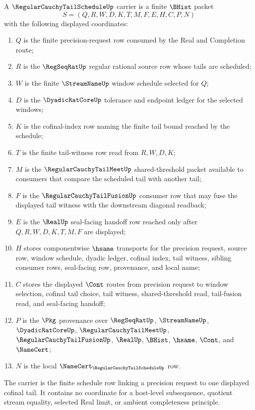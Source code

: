 \begin{definition}
\label{def:regular-cauchy-tail-schedule-carrier}
A $\RegularCauchyTailScheduleUp$ carrier is a finite $\BHist$ packet
$$
S=(Q,R,W,D,K,T,M,F,E,H,C,P,N)
$$
with the following displayed coordinates:
\begin{enumerate}
\item $Q$ is the finite precision-request row consumed by the Real and Completion route;
\item $R$ is the $\RegSeqRatUp$ regular rational source row whose tails are scheduled;
\item $W$ is the finite $\StreamNameUp$ window schedule selected for $Q$;
\item $D$ is the $\DyadicRatCoreUp$ tolerance and endpoint ledger for the selected windows;
\item $K$ is the cofinal-index row naming the finite tail bound reached by the schedule;
\item $T$ is the finite tail-witness row read from $R,W,D,K$;
\item $M$ is the $\RegularCauchyTailMeetUp$ shared-threshold packet available to consumers that compare the scheduled tail with another tail;
\item $F$ is the $\RegularCauchyTailFusionUp$ consumer row that may fuse the displayed tail witness with the downstream diagonal readback;
\item $E$ is the $\RealUp$ seal-facing handoff row reached only after $Q,R,W,D,K,T,M,F$ are displayed;
\item $H$ stores componentwise $\hsame$ transports for the precision request, source row, window schedule, dyadic ledger, cofinal index, tail witness, sibling consumer rows, seal-facing row, provenance, and local name;
\item $C$ stores the displayed $\Cont$ routes from precision request to window selection, cofinal tail choice, tail witness, shared-threshold read, tail-fusion read, and seal-facing handoff;
\item $P$ is the $\Pkg$ provenance over $\RegSeqRatUp$, $\StreamNameUp$, $\DyadicRatCoreUp$, $\RegularCauchyTailMeetUp$, $\RegularCauchyTailFusionUp$, $\RealUp$, $\BHist$, $\hsame$, $\Cont$, and $\NameCert$;
\item $N$ is the local $\NameCert_{\RegularCauchyTailScheduleUp}$ row.
\end{enumerate}
The carrier is the finite schedule row linking a precision request to one displayed cofinal tail. It contains no coordinate for a host-level subsequence, quotient stream equality, selected Real limit, or ambient completeness principle.
\end{definition}


